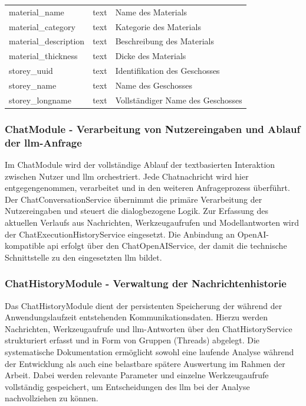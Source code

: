 \begin{table}[!htb]
\begin{tabular}{C{3cm} C{1.5cm} L{6.5cm}}
        material\_name & text & Name des Materials \\

        material\_category & text & Kategorie des Materials \\

        material\_description & text & Beschreibung des Materials \\

        material\_thickness & text & Dicke des Materials \\

        storey\_uuid & text & Identifikation des Geschosses \\

        storey\_name & text & Name des Geschosses \\

        storey\_longname & text & Vollständiger Name des Geschosses \\

        \hline
    \end{tabular}
\end{table}

\subsubsection{ChatModule - Verarbeitung von Nutzereingaben und Ablauf der \gls{llm}-Anfrage}
\label{sec:app-chatmodule}

Im ChatModule wird der vollständige Ablauf der textbasierten Interaktion zwischen Nutzer und \gls{llm} orchestriert.
Jede Chatnachricht wird hier entgegengenommen, verarbeitet und in den weiteren Anfrageprozess überführt.
Der ChatConversationService übernimmt die primäre Verarbeitung der Nutzereingaben und steuert die dialogbezogene Logik.
Zur Erfassung des aktuellen Verlaufs aus Nachrichten, Werkzeugaufrufen und Modellantworten wird der ChatExecutionHistoryService eingesetzt.
Die Anbindung an OpenAI-kompatible \gls{api} erfolgt über den ChatOpenAIService, der damit die technische Schnittstelle zu den eingesetzten \gls{llm} bildet.

\subsubsection{ChatHistoryModule - Verwaltung der Nachrichtenhistorie}
\label{sec:app-chathistorymodule}

Das ChatHistoryModule dient der persistenten Speicherung der während der Anwendungslaufzeit entstehenden Kommunikationsdaten.
Hierzu werden Nachrichten, Werkzeugaufrufe und \gls{llm}-Antworten über den ChatHistoryService strukturiert erfasst und in Form von Gruppen (Threads) abgelegt.
Die systematische Dokumentation ermöglicht sowohl eine laufende Analyse während der Entwicklung als auch eine belastbare spätere Auswertung im Rahmen der Arbeit.
Dabei werden relevante Parameter und einzelne Werkzeugaufrufe vollständig gespeichert, um Entscheidungen des \gls{llm} bei der Analyse nachvollziehen zu können.

